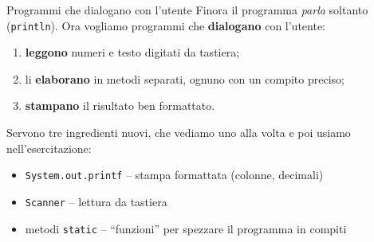 \documentclass[10pt,aspectratio=169]{beamer}
\begin{document}
\begin{frame}[fragile]{Programmi che dialogano con l'utente}
Finora il programma \emph{parla} soltanto (\texttt{println}). Ora vogliamo programmi che \textbf{dialogano} con l'utente:
\begin{enumerate}\itemsep=0pt
    \item \textbf{leggono} numeri e testo digitati da tastiera;
    \item li \textbf{elaborano} in metodi separati, ognuno con un compito preciso;
    \item \textbf{stampano} il risultato ben formattato.
\end{enumerate}


\vspace{0.1cm}
Servono tre ingredienti nuovi, che vediamo uno alla volta e poi usiamo nell'esercitazione:
\begin{itemize}\itemsep=0pt
    \item \texttt{System.out.printf} -- stampa formattata (colonne, decimali)
    \item \texttt{Scanner} -- lettura da tastiera
    \item metodi \texttt{static} -- ``funzioni'' per spezzare il programma in compiti
\end{itemize}
\end{frame}
\end{document}
